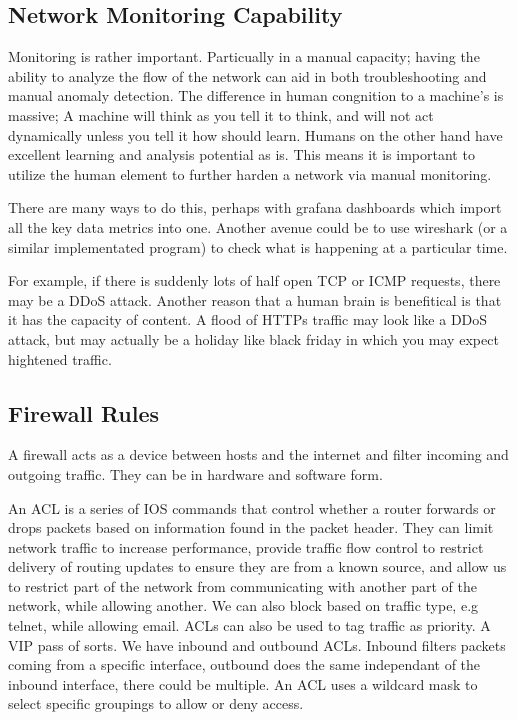 \subsection{Network Monitoring Capability}
Monitoring is rather important. Particually in a manual capacity; having the ability to analyze the flow of the network can aid in both troubleshooting and manual anomaly detection. The difference in human congnition to a machine's is massive; A machine will think as you tell it to think,
and will not act dynamically unless you tell it how should learn. Humans on the other hand have excellent learning and analysis potential as is. This means it is important to utilize the human element to further harden a network via manual monitoring. 

There are many ways to do this, perhaps with grafana dashboards which import all the key data metrics into one. Another avenue could be to use wireshark (or a similar implementated program) to check what is happening at a particular time. 

For example, if there is suddenly lots of half open TCP or ICMP requests, there may be a DDoS attack. Another reason that a human brain is benefitical is that it has the capacity of content. A flood of HTTPs traffic may look like a DDoS attack, 
but may actually be a holiday like black friday in which you may expect hightened traffic.

\subsection{Firewall Rules}
A firewall acts as a device between hosts and the internet and filter incoming and outgoing traffic. They can be in hardware and software form.

An ACL is a series of IOS commands that control whether a router forwards or drops packets based on information found in the packet header. They can limit network traffic to increase performance, provide traffic flow control to restrict delivery of routing updates to 
ensure they are from a known source, and allow us to restrict part of the network from communicating with another part of the network, while allowing another. We can also block based on traffic type, e.g telnet, while allowing email. ACLs can also be used to tag traffic as priority. 
A VIP pass of sorts. We have inbound and outbound ACLs. Inbound filters packets coming from a specific interface, outbound does the same independant of the inbound interface, there could be multiple. An ACL uses a wildcard mask to select specific groupings to allow or deny access.

